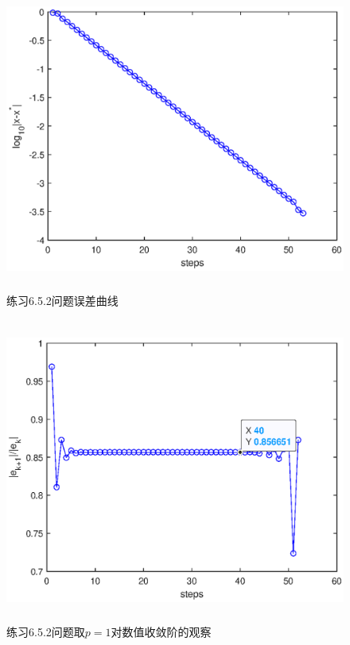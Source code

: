 \documentclass[UTF8,a4paper,10pt]{ctexart}
\begin{document}
        \begin{figure}[htbp]
            \centering
            \includegraphics[width=14cm,height=10cm]{3_2_error.eps}
            \caption{练习6.5.2问题误差曲线}
        \end{figure}
        \begin{figure}[htbp]
            \centering
            \includegraphics[width=14cm,height=10cm]{3_2_order.eps}
            \caption{练习6.5.2问题取$p=1$对数值收敛阶的观察} 
        \end{figure}
\end{document}
